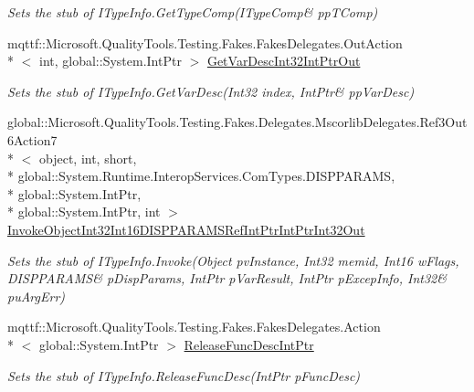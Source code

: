 \begin{DoxyCompactItemize}
\begin{DoxyCompactList}\small\item\em Sets the stub of I\-Type\-Info.\-Get\-Type\-Comp(I\-Type\-Comp\& pp\-T\-Comp)\end{DoxyCompactList}\item 
mqttf\-::\-Microsoft.\-Quality\-Tools.\-Testing.\-Fakes.\-Fakes\-Delegates.\-Out\-Action\\*
$<$ int, global\-::\-System.\-Int\-Ptr $>$ \hyperlink{class_system_1_1_runtime_1_1_interop_services_1_1_com_types_1_1_fakes_1_1_stub_i_type_info_a27c61506b1d408d5dda6513bd60c8c5d}{Get\-Var\-Desc\-Int32\-Int\-Ptr\-Out}
\begin{DoxyCompactList}\small\item\em Sets the stub of I\-Type\-Info.\-Get\-Var\-Desc(Int32 index, Int\-Ptr\& pp\-Var\-Desc)\end{DoxyCompactList}\item 
global\-::\-Microsoft.\-Quality\-Tools.\-Testing.\-Fakes.\-Delegates.\-Mscorlib\-Delegates.\-Ref3\-Out6\-Action7\\*
$<$ object, int, short, \\*
global\-::\-System.\-Runtime.\-Interop\-Services.\-Com\-Types.\-D\-I\-S\-P\-P\-A\-R\-A\-M\-S, \\*
global\-::\-System.\-Int\-Ptr, \\*
global\-::\-System.\-Int\-Ptr, int $>$ \hyperlink{class_system_1_1_runtime_1_1_interop_services_1_1_com_types_1_1_fakes_1_1_stub_i_type_info_a0e7e629cb8e8c9f791c888e1d240e27e}{Invoke\-Object\-Int32\-Int16\-D\-I\-S\-P\-P\-A\-R\-A\-M\-S\-Ref\-Int\-Ptr\-Int\-Ptr\-Int32\-Out}
\begin{DoxyCompactList}\small\item\em Sets the stub of I\-Type\-Info.\-Invoke(Object pv\-Instance, Int32 memid, Int16 w\-Flags, D\-I\-S\-P\-P\-A\-R\-A\-M\-S\& p\-Disp\-Params, Int\-Ptr p\-Var\-Result, Int\-Ptr p\-Excep\-Info, Int32\& pu\-Arg\-Err)\end{DoxyCompactList}\item 
mqttf\-::\-Microsoft.\-Quality\-Tools.\-Testing.\-Fakes.\-Fakes\-Delegates.\-Action\\*
$<$ global\-::\-System.\-Int\-Ptr $>$ \hyperlink{class_system_1_1_runtime_1_1_interop_services_1_1_com_types_1_1_fakes_1_1_stub_i_type_info_ac956c1a8a62f2e0a48c248bbe8cba542}{Release\-Func\-Desc\-Int\-Ptr}
\begin{DoxyCompactList}\small\item\em Sets the stub of I\-Type\-Info.\-Release\-Func\-Desc(\-Int\-Ptr p\-Func\-Desc)\end{DoxyCompactList}\item 

\end{DoxyCompactItemize}
